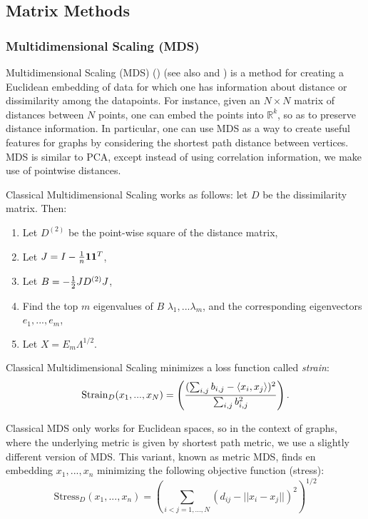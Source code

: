\subsection{Matrix Methods}
\subsubsection{Multidimensional Scaling (MDS)}
Multidimensional Scaling (MDS) (\cite{kruskal1964multidimensional}) (see also \cite{cox2000multidimensional} and \cite{borg2003modern}) is a method for creating a Euclidean embedding of data for which one has information about distance or dissimilarity among the datapoints. For instance, given an $N \times N$ matrix of distances between $N$ points, one can embed the points into $\mathbb{R}^k$, so as to preserve distance information. In particular, one can use MDS as a way to create useful features for graphs by considering the shortest path distance between vertices. MDS is similar to PCA, except instead of using correlation information, we make use of pointwise distances.

Classical Multidimensional Scaling works as follows: let $D$ be the dissimilarity matrix. Then:
\begin{enumerate}
  \item Let $D^{(2)}$ be the point-wise square of the distance matrix,
  \item Let $J = I - {1\over n}{\mathbf{1}}{\mathbf{1}}^T$,
  \item Let $B = -{1 \over 2}JD^{(2)}J$,
  \item Find the top $m$ eigenvalues of $B$ $\lambda_1, ... \lambda_m$, and the corresponding eigenvectors $e_1, ... , e_m$,
  \item Let $X = E_m\Lambda^{1/2}$.
\end{enumerate}

Classical Multidimensional Scaling minimizes a loss function called \emph{strain}:
\[
    \text{Strain}_D(x_1, ... , x_N) = \left( ({\sum_{i,j}b_{i,j}- \langle x_i,x_j \rangle})^2 \over \sum_{i,j}b_{i,j}^2\right).
\]

Classical MDS only works for Euclidean spaces, so in the context of graphs, where the underlying metric is given by shortest path metric, we use a slightly different version of MDS. This variant, known as metric MDS, finds en embedding $x_1, ... , x_n$ minimizing the following objective function (stress):
\[
    \text{Stress}_D(x_1, ... , x_n) = \left(\sum_{i < j = 1, ... ,N}(d_{ij} - ||x_i - x_j||)^2\right)^{1/2}
\]

